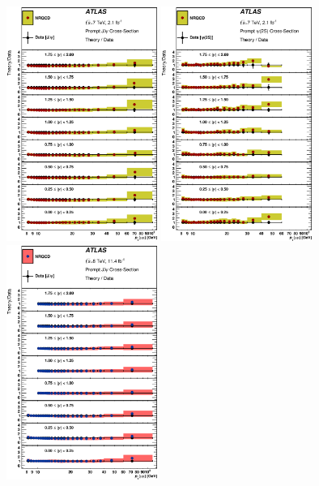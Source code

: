 \begin{description}[style=unboxed,leftmargin=0cm]
\begin{figure} [!ht]
  \begin{center}
    \includegraphics[width=0.44\textwidth]{figures/ct_7TeV_JpsiP_theoryRatio_lin.eps} 
    \includegraphics[width=0.44\textwidth]{figures/ct_7TeV_Psi2SP_theoryRatio_lin.eps}\hfil\\
    \includegraphics[width=0.44\textwidth]{figures/ct_8TeV_JpsiP_theoryRatio_lin.eps}

\end{center}
\end{figure}
\end{description}

